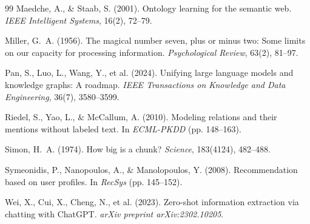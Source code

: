\documentclass[11pt]{article}
\begin{document}
\begin{thebibliography}{99}
Maedche, A., \& Staab, S. (2001).
Ontology learning for the semantic web.
\textit{IEEE Intelligent Systems}, 16(2), 72--79.

Miller, G.~A. (1956).
The magical number seven, plus or minus two: Some limits on our capacity for processing information.
\textit{Psychological Review}, 63(2), 81--97.

Pan, S., Luo, L., Wang, Y., et al. (2024).
Unifying large language models and knowledge graphs: A roadmap.
\textit{IEEE Transactions on Knowledge and Data Engineering}, 36(7), 3580--3599.

Riedel, S., Yao, L., \& McCallum, A. (2010).
Modeling relations and their mentions without labeled text.
In \textit{ECML-PKDD} (pp. 148--163).

Simon, H.~A. (1974).
How big is a chunk?
\textit{Science}, 183(4124), 482--488.

Symeonidis, P., Nanopoulos, A., \& Manolopoulos, Y. (2008).
Recommendation based on user profiles.
In \textit{RecSys} (pp. 145--152).

Wei, X., Cui, X., Cheng, N., et al. (2023).
Zero-shot information extraction via chatting with ChatGPT.
\textit{arXiv preprint arXiv:2302.10205}.

\end{thebibliography}
\end{document}
